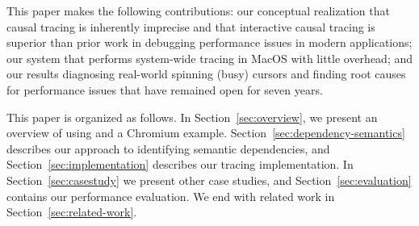 This paper makes the following contributions: our conceptual realization
that causal tracing is inherently imprecise and that interactive causal
tracing is superior than prior work in debugging performance issues in
modern applications; our system \xxx that performs system-wide tracing in
MacOS with little overhead; and our results diagnosing real-world spinning (busy)
cursors and finding root causes for performance issues that have remained open
for seven years.

This paper is organized as follows. In Section~\ref{sec:overview}, we present
an overview of using \xxx and a Chromium example. Section~\ref{sec:dependency-semantics} describes our approach to identifying semantic dependencies,
and Section~\ref{sec:implementation} describes our tracing implementation. In Section~\ref{sec:casestudy} we present other case studies,
and Section~\ref{sec:evaluation} contains our performance evaluation. We end with related work in Section~\ref{sec:related-work}.



